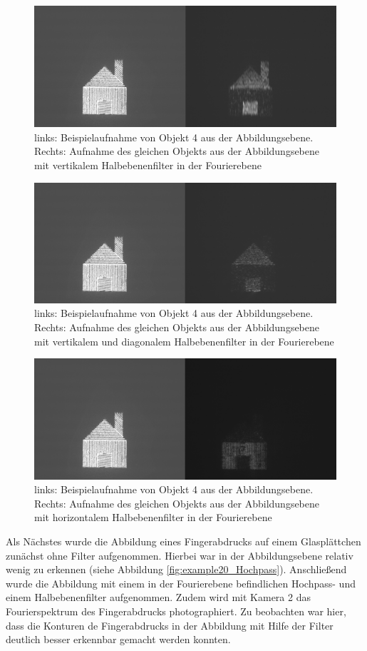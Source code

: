 \begin{figure}
\centering
\includegraphics[width=0.7\linewidth]{images/edit-xcf/example17}
\caption{links: Beispielaufnahme von Objekt 4 aus der Abbildungsebene. Rechts: Aufnahme des gleichen Objekts aus der Abbildungsebene mit vertikalem Halbebenenfilter in der Fourierebene}
\label{fig:example17}
\end{figure}

\begin{figure}
\centering
\includegraphics[width=0.7\linewidth]{images/edit-xcf/example18}
\caption{links: Beispielaufnahme von Objekt 4 aus der Abbildungsebene. Rechts: Aufnahme des gleichen Objekts aus der Abbildungsebene mit vertikalem und diagonalem Halbebenenfilter in der Fourierebene}
\label{fig:example18}
\end{figure}

\begin{figure}
\centering
\includegraphics[width=0.7\linewidth]{images/edit-xcf/example19}
\caption{links: Beispielaufnahme von Objekt 4 aus der Abbildungsebene. Rechts: Aufnahme des gleichen Objekts aus der Abbildungsebene mit horizontalem Halbebenenfilter in der Fourierebene}
\label{fig:example19}
\end{figure}

Als Nächstes wurde die Abbildung eines Fingerabdrucks auf einem Glasplättchen zunächst ohne Filter aufgenommen. Hierbei war in der Abbildungsebene relativ wenig zu erkennen (siehe Abbildung \ref{fig:example20_Hochpass}). Anschließend wurde die Abbildung mit einem in der Fourierebene befindlichen Hochpass- und einem Halbebenenfilter aufgenommen. Zudem wird mit Kamera 2 das Fourierspektrum des Fingerabdrucks photographiert. Zu beobachten war hier, dass die Konturen de Fingerabdrucks in der Abbildung mit Hilfe der Filter deutlich besser erkennbar gemacht werden konnten.\\

